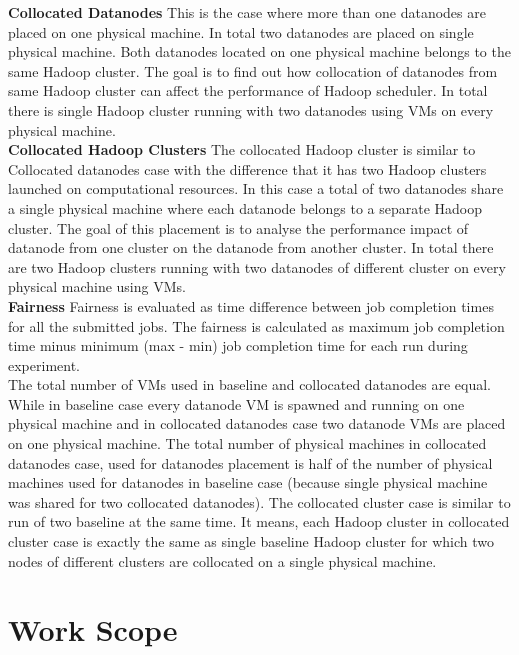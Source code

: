 \textbf{Collocated Datanodes} This is the case where more than one datanodes are placed on one physical machine. In total two datanodes are placed on single physical machine. Both datanodes located on one physical machine belongs to the same Hadoop cluster. The goal is to find out how collocation of datanodes from same Hadoop cluster can affect the performance of Hadoop scheduler. In total there is single Hadoop cluster running with two datanodes using VMs on every physical machine. \\
 
\textbf{Collocated Hadoop Clusters } The collocated Hadoop cluster is similar to Collocated datanodes case with the difference that it has two Hadoop clusters launched on computational resources. In this case a total of two datanodes share a single physical machine where each datanode belongs to a separate Hadoop cluster. The goal of this placement is to analyse the performance impact of datanode from one cluster on the datanode from another cluster. In total there are two Hadoop clusters running  with two datanodes of different cluster on every physical machine using VMs.\\  

\textbf{Fairness } Fairness is evaluated as time difference between job completion times for all the submitted jobs. The fairness is calculated as maximum job completion time minus minimum (max - min) job completion time for each run during experiment. \\

The total number of VMs used in baseline and collocated datanodes are equal. While in baseline case every datanode VM is spawned and running on one physical machine and in collocated datanodes case two datanode VMs are placed on one physical machine. The total number of physical machines in collocated datanodes case, used for datanodes placement  is half of the number of physical machines used for datanodes in baseline case (because single physical machine was shared for two collocated datanodes). The collocated cluster case is similar to run of two baseline at the same time. It means, each Hadoop cluster in collocated cluster case is exactly the same as single baseline Hadoop cluster for which two nodes of different clusters are collocated on a single physical machine.  
  


\section{Work Scope}



